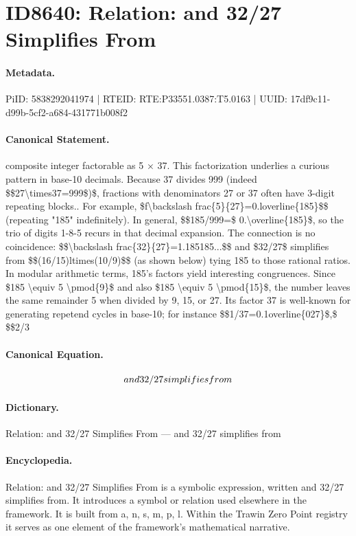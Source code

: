 \section*{ID8640: Relation: and 32/27 Simplifies From}
\paragraph{Metadata.}
PiID: 5838292041974 | RTEID: RTE:P33551.0387:T5.0163 | UUID: 17df9c11-d99b-5cf2-a684-431771b008f2

\paragraph{Canonical Statement.}
composite integer factorable as 5 × 37. This factorization underlies a curious pattern in base-10 decimals. Because 37 divides 999 (indeed \$\$27\textbackslash{}times37=999\$)\$, fractions with denominators 27 or 37 often have 3-digit repeating blocks.. For example, \$f\textbackslash{}backslash frac\{5\}\{27\}=0.loverline\{185\}\$\$ (repeating "185" indefinitely). In general, \$\$185/999=\$ 0.\textbackslash{}overline\{185\}\$, so the trio of digits 1-8-5 recurs in that decimal expansion. The connection is no coincidence: \$\$\textbackslash{}backslash frac\{32\}\{27\}=1.185185...\$\$ and \$32/27\$ simplifies from \$\$(16/15)ltimes(10/9)\$\$ (as shown below) tying 185 to those rational ratios. In modular arithmetic terms, 185's factors yield interesting congruences. Since \$185 \textbackslash{}equiv 5 \textbackslash{}pmod\{9\}\$ and also \$185 \textbackslash{}equiv 5 \textbackslash{}pmod\{15\}\$, the number leaves the same remainder 5 when divided by 9, 15, or 27. Its factor 37 is well-known for generating repetend cycles in base-10; for instance \$\$1/37=0.1overline\{027\}\$,\$ \$\$2/3

\paragraph{Canonical Equation.}
\[
and $32/27$ simplifies from
\]

\paragraph{Dictionary.}
Relation: and 32/27 Simplifies From — and 32/27 simplifies from

\paragraph{Encyclopedia.}
Relation: and 32/27 Simplifies From is a symbolic expression, written and 32/27 simplifies from. It introduces a symbol or relation used elsewhere in the framework. It is built from a, n, s, m, p, l. Within the Trawin Zero Point registry it serves as one element of the framework's mathematical narrative.
